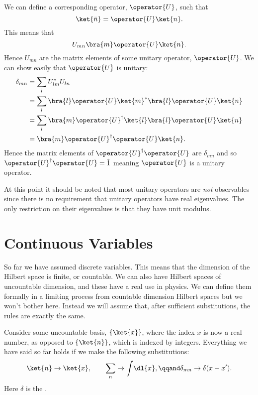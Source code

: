 \documentclass[fleqn]{NotesClass}
\newcommand*{\idop}{\hat{1}}
\newcommand*{\hermit}{\dagger}
\begin{document}
    We can define a corresponding operator, \(\operator{U}\), such that
    \begin{equation}
        \ket{\bar{n}} = \operator{U}\ket{n}.
    \end{equation}
    This means that
    \begin{equation}
        U_{mn} \bra{m}\operator{U}\ket{n}.
    \end{equation}
    Hence \(U_{mn}\) are the matrix elements of some unitary operator, \(\operator{U}\).
    We can show easily that \(\operator{U}\) is unitary:
    \begin{align}
        \delta_{mn} &= \sum_{l}U_{lm}^*U_{ln}\\
        &= \sum_l \bra{l}\operator{U}\ket{m}^*\bra{l}\operator{U}\ket{n}\\
        &= \sum_l \bra{m}\operator{U}^\hermit\ket{l}\bra{l}\operator{U}\ket{n}\\
        &= \bra{m}\operator{U}^\hermit \operator{U} \ket{n}.
    \end{align}
    Hence the matrix elements of \(\operator{U}^\hermit \operator{U}\) are \(\delta_{mn}\) and so \(\operator{U}^\hermit \operator{U} = \idop\) meaning \(\operator{U}\) is a unitary operator.
    
    At this point it should be noted that most unitary operators are \emph{not} observables since there is no requirement that unitary operators have real eigenvalues.
    The only restriction on their eigenvalues is that they have unit modulus.
    
    \section{Continuous Variables}
    So far we have assumed discrete variables.
    This means that the dimension of the Hilbert space is finite, or countable.
    We can also have Hilbert spaces of uncountable dimension, and these have a real use in physics.
    We can define them formally in a limiting process from countable dimension Hilbert spaces but we won't bother here.
    Instead we will assume that, after sufficient substitutions, the rules are exactly the same.
    
    Consider some uncountable basis, \(\{\ket{x}\}\), where the index \(x\) is now a real number, as opposed to \(\{\ket{n}\}\), which is indexed by integers.
    Everything we have said so far holds if we make the following substitutions:
    \begin{equation}
         \ket{n} \to \ket{x}, \qquad \sum_n \to\int \! \dl{x}, \qqand \delta_{mn} \to \delta(x - x').
    \end{equation}
    Here \(\delta\) is the .
    
\end{document}
